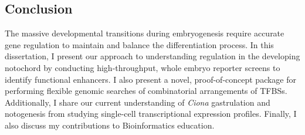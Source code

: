 \begin{dissertationintroduction}
    \section{Conclusion}

    The massive developmental transitions during embryogenesis require accurate gene regulation to maintain and balance the differentiation process. In this dissertation, I present our approach to understanding regulation in the developing notochord by conducting high-throughput, whole embryo reporter screens to identify functional enhancers. I also present a novel, proof-of-concept package for performing flexible genomic searches of combinatorial arrangements of TFBSs. Additionally, I share our current understanding of \textit{Ciona} gastrulation and notogenesis from studying single-cell transcriptional expression profiles. Finally, I also discuss my contributions to Bioinformatics education.
    
\end{dissertationintroduction}
